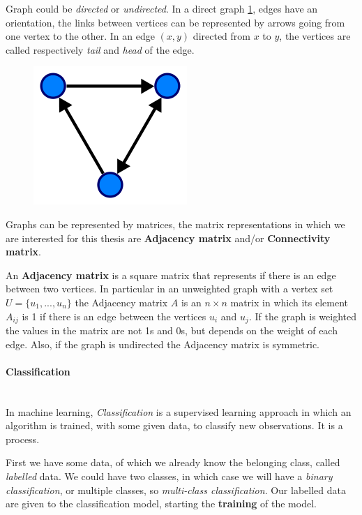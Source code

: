 Graph could be \textit{directed} or \textit{undirected}. In a direct graph \ref{fig:diagram2}, edges have an orientation, the links between vertices can be represented by arrows going from one vertex to the other. In an edge $ (x,y) $ directed from $ x $ to $ y $, the vertices are called respectively \textit{tail} and \textit{head} of the edge.
\begin{figure}[htbp]
	\centering
	\includegraphics[scale=0.5]{Immagini/220px-Directed.svg.png}
	\caption{\label{fig:diagram2}}
\end{figure}

Graphs can be represented by matrices, the matrix representations in which we are interested for this thesis are \textbf{Adjacency matrix} and/or \textbf{Connectivity matrix}. 

An \textbf{Adjacency matrix} is a square matrix that represents if there is an edge between two vertices. In particular in an unweighted graph with a vertex set $ U=\{u_{1}, ..., u_{n}\} $ the Adjacency matrix $ A $ is an $ n \times n $ matrix in which its element $ A_{ij} $ is 1 if there is an edge between the vertices $ u_{i} $ and $ u_{j} $. If the graph is weighted the values in the matrix are not 1s and 0s, but depends on the weight of each edge. Also, if the graph is undirected the Adjacency matrix is symmetric.


\paragraph{Classification}\
\\
In machine learning, \emph{Classification} is a supervised learning approach in which an algorithm is trained, with some given data, to classify new observations. It is a process. 

First we have some data, of which we already know the belonging class, called \emph{labelled} data. We could have two classes, in which case we will have a \emph{binary classification}, or multiple classes, so \emph{multi-class classification}. Our labelled data are given to the classification model, starting the \textbf{training} of the model.

